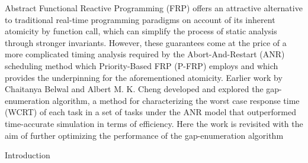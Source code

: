 \documentclass{article}
\begin{document}
\tableofcontents

\begin{section}{Abstract}
  Functional Reactive Programming (FRP) offers an attractive alternative to traditional
  real-time programming paradigms on account of its inherent atomicity by function call,
  which can simplify the process of static analysis through stronger invariants.
  However, these guarantees come at the price of a more complicated timing analysis
  required by the Abort-And-Restart (ANR) scheduling method which Priority-Based FRP
  (P-FRP) employs and which provides the underpinning for the aforementioned atomicity.
  Earlier work by Chaitanya Belwal and Albert M. K. Cheng developed and explored the
  gap-enumeration algorithm, a method for characterizing the worst case response time (WCRT)
  of each task in a set of tasks under the ANR model that outperformed time-accurate simulation
  in terms of efficiency. Here the work is revisited with the aim of further optimizing the
  performance of the gap-enumeration algorithm
\end{section}

\begin{section}{Introduction}
\end{section}
\end{document}
